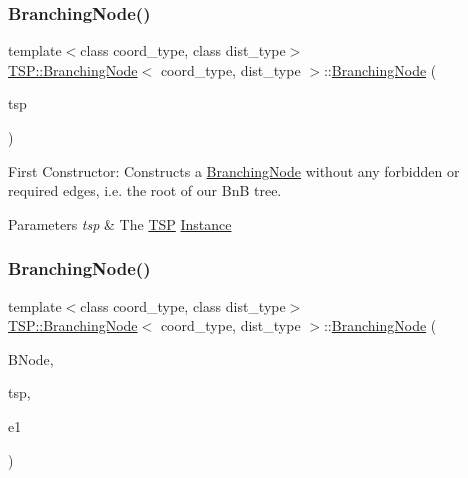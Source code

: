 \subsubsection{\texorpdfstring{Branching\+Node()}{BranchingNode()}\hspace{0.1cm}{\footnotesize\ttfamily [1/4]}}
{\footnotesize\ttfamily template$<$class coord\+\_\+type, class dist\+\_\+type$>$ \\
\hyperlink{classTSP_1_1BranchingNode}{T\+S\+P\+::\+Branching\+Node}$<$ coord\+\_\+type, dist\+\_\+type $>$\+::\hyperlink{classTSP_1_1BranchingNode}{Branching\+Node} (\begin{DoxyParamCaption}\item[{const \hyperlink{classTSP_1_1Instance}{Instance}$<$ coord\+\_\+type, dist\+\_\+type $>$ \&}]{tsp }\end{DoxyParamCaption})\hspace{0.3cm}{\ttfamily [inline]}}

First Constructor\+: Constructs a \hyperlink{classTSP_1_1BranchingNode}{Branching\+Node} without any forbidden or required edges, i.\+e. the root of our B\textquotesingle{}n\textquotesingle{}B tree. 
\begin{DoxyParams}{Parameters}
{\em tsp} & The \hyperlink{namespaceTSP}{T\+SP} \hyperlink{classTSP_1_1Instance}{Instance} \\
\hline
\end{DoxyParams}
\mbox{\label{classTSP_1_1BranchingNode_a7c225b395563f9d64febea67bbbe5394}} 
\subsubsection{\texorpdfstring{Branching\+Node()}{BranchingNode()}\hspace{0.1cm}{\footnotesize\ttfamily [2/4]}}
{\footnotesize\ttfamily template$<$class coord\+\_\+type, class dist\+\_\+type$>$ \\
\hyperlink{classTSP_1_1BranchingNode}{T\+S\+P\+::\+Branching\+Node}$<$ coord\+\_\+type, dist\+\_\+type $>$\+::\hyperlink{classTSP_1_1BranchingNode}{Branching\+Node} (\begin{DoxyParamCaption}\item[{const \hyperlink{classTSP_1_1BranchingNode}{Branching\+Node}$<$ coord\+\_\+type, dist\+\_\+type $>$ \&}]{B\+Node,  }\item[{const \hyperlink{classTSP_1_1Instance}{Instance}$<$ coord\+\_\+type, dist\+\_\+type $>$ \&}]{tsp,  }\item[{Edge\+Id}]{e1 }\end{DoxyParamCaption})\hspace{0.3cm}{\ttfamily [inline]}}

